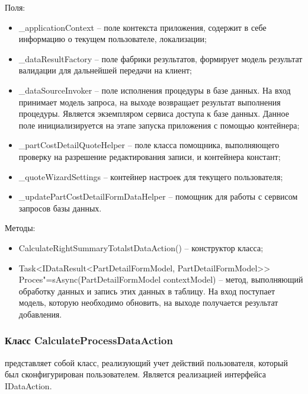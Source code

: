 Поля:
\begin{itemize}
  \item \_applicationContext – поле контекста приложения, содержит в себе информацию о текущем пользователе, локализации;
  \item \_dataResultFactory – поле фабрики результатов, формирует модель результат валидации для дальнейшей передачи на клиент;
  \item \_dataSourceInvoker – поле исполнения процедуры в базе данных. На вход принимает модель запроса, на выходе возвращает результат выполнения процедуры. Является экземпляром сервиса доступа к базе данных. Данное поле инициализируется на этапе запуска приложения с помощью контейнера;
  \item \_partCostDetailQuoteHelper – поле класса помощника, выполняющего проверку на разрешение редактирования записи, и контейнера констант;
  \item \_quoteWizardSettings – контейнер настроек для текущего пользователя;
  \item \_updatePartCostDetailFormDataHelper – помощник для работы с сервисом запросов базы данных.
\end{itemize}

Методы:
\begin{itemize}
  \item CalculateRightSummaryTotalstDataAction() – конструктор класса;
  \item Task<IDataResult<PartDetailFormModel, PartDetailFormModel>> Proces"=sAsync(PartDetailFormModel contextModel) – метод, выполняющий обработку данных и запись этих данных в таблицу. На вход поступает модель, которую необходимо обновить, на выходе получается результат добавления.
\end{itemize}

\subsubsection{Класс CalculateProcessDataAction }
\label{sub:arch_and_mod:data_layer:calculate_process}

представляет собой класс, реализующий учет действий пользователя, который был сконфигурирован пользователем. Является реализацией интерфейса IDataAction.

